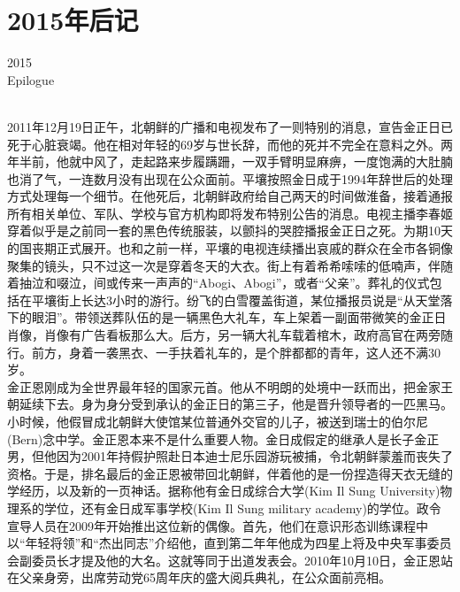 \fancyhead[RO]{{\tiny{\textcolor{Gray}{\FA \ }}}\thepage}
\fancyhead[LE]{{\tiny{\textcolor{Gray}{\FA \ }}}\thepage}
\fancyfoot[LE,RO]{}
\fancyfoot[LO,CE]{}
\fancyfoot[CO,RE]{}
\chapter*{2015年后记}
\vspace{10mm}
\begin{flushright}
	\textcolor{PinYinColor}{\EN \huge{2015\\
	Epilogue\\
	\ \\}}
\end{flushright}
2011年12月19日正午，北朝鲜的广播和电视发布了一则特别的消息，宣告金正日已死于心脏衰竭。他在相对年轻的69岁与世长辞，而他的死并不完全在意料之外。两年半前，他就中风了，走起路来步履蹒跚，一双手臂明显麻痹，一度饱满的大肚腩也消了气，一连数月没有出现在公众面前。平壤按照金日成于1994年辞世后的处理方式处理每一个细节。在他死后，北朝鲜政府给自己两天的时间做淮备，接着通报所有相关单位、军队、学校与官方机构即将发布特别公告的消息。电视主播李春姬穿着似乎是之前同一套的黑色传统服装，以颤抖的哭腔播报金正日之死。为期10天的国丧期正式展开。也和之前一样，平壤的电视连续播出哀戚的群众在全市各铜像聚集的镜头，只不过这一次是穿着冬天的大衣。街上有着希希嗦嗦的低喃声，伴随着抽泣和啜泣，间或传来一声声的“Abogi、Abogi”，或者“父亲”。葬礼的仪式包括在平壤街上长达3小时的游行。纷飞的白雪覆盖街道，某位播报员说是“从天堂落下的眼泪”。带领送葬队伍的是一辆黑色大礼车，车上架着一副面带微笑的金正日肖像，肖像有广告看板那么大。后方，另一辆大礼车载着棺木，政府高官在两旁随行。前方，身着一袭黑衣、一手扶着礼车的，是个胖都都的青年，这人还不满30岁。\\

金正恩刚成为全世界最年轻的国家元首。他从不明朗的处境中一跃而出，把金家王朝延续下去。身为身分受到承认的金正日的第三子，他是晋升领导者的一匹黑马。小时候，他假冒成北朝鲜大使馆某位普通外交官的儿子，被送到瑞士的伯尔尼(Bern)念中学。金正恩本来不是什么重要人物。金日成假定的继承人是长子金正男，但他因为2001年持假护照赴日本迪士尼乐园游玩被捕，令北朝鲜蒙羞而丧失了资格。于是，排名最后的金正恩被带回北朝鲜，伴着他的是一份捏造得天衣无缝的学经历，以及新的一页神话。据称他有金日成综合大学(Kim Il Sung University)物理系的学位，还有金日成军事学校(Kim Il Sung military academy)的学位。政令宣导人员在2009年开始推出这位新的偶像。首先，他们在意识形态训练课程中以“年轻将领”和“杰出同志”介绍他，直到第二年年他成为四星上将及中央军事委员会副委员长才提及他的大名。这就等同于出道发表会。2010年10月10日，金正恩站在父亲身旁，出席劳动党65周年庆的盛大阅兵典礼，在公众面前亮相。\\

